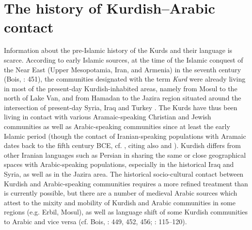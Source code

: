 \documentclass[output=paper]{langsci/langscibook}
\begin{document}
\section{The history of Kurdish–Arabic contact} 

Information about the pre-Islamic history of the Kurds and their language is scarce. According to early Islamic sources, at the time of the Islamic conquest of the Near East (Upper Mesopotamia, Iran, and Armenia) in the seventh century (Bois, \citealt{MinorskyMacKenzie2012}: 451), the communities designated with the term \textit{Kurd} were already living in most of the present-day Kurdish-inhabited areas, namely from Mosul to the north of Lake Van, and from Hamadan to the Jazira region situated around the intersection of present-day Syria, Iraq and Turkey \citep[111]{James2007}. The Kurds have thus been living in contact with various Aramaic-speaking Christian and Jewish communities as well as Arabic-speaking communities since at least the early Islamic period (though the contact of Iranian-speaking populations with Aramaic dates back to the fifth century BCE, cf. \citep[69]{Utas2005}, citing also \citep{Folmer1995} and \citep{Kent1953}). Kurdish differs from other Iranian languages such as Persian in sharing the same or close geographical spaces with Arabic-speaking populations, especially in the historical Iraq and Syria, as well as in the Jazira area. The historical socio-cultural contact between Kurdish and Arabic-speaking communities requires a more refined treatment than is currently possible, but there are a number of medieval Arabic sources which attest to the mixity and mobility of Kurdish and Arabic communities in some regions (e.g. Erbil, Mosul), as well as language shift of some Kurdish communities to Arabic and vice versa (cf. Bois, \citealt{MinorskyMacKenzie2012}: 449, 452, 456; \citealt{James2007}: 115–120). 
\end{document}

